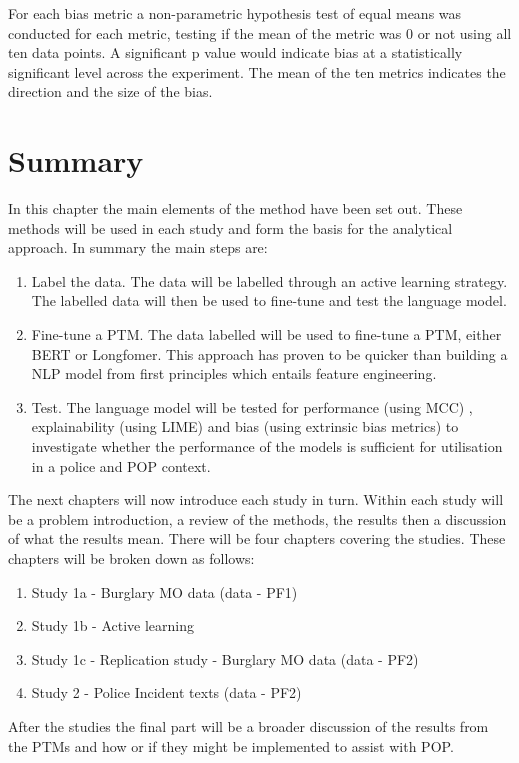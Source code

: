 \begin{itemize}
For each bias metric a non-parametric hypothesis test of equal means was conducted for each metric, testing if the mean of the metric was 0 or not using all ten data points. A significant p value would indicate bias at a statistically significant level across the experiment. The mean of the ten metrics indicates the direction and the size of the bias. 


\end{itemize}


\section{Summary} In this chapter the main elements of the method have been set out. These methods will be used in each study and form the basis for the analytical approach. In summary the main steps are:

\begin{enumerate}
    \item Label the data. The data will be labelled through an active learning strategy. The labelled data will then be used to fine-tune and test the language model.
    
    \item Fine-tune a PTM. The data labelled will be used to fine-tune a PTM, either BERT or Longfomer. This approach has proven to be quicker than building a NLP model from first principles which entails feature engineering.
    
    \item Test. The language model will be tested for performance (using MCC) , explainability (using LIME)  and bias (using extrinsic bias metrics) to investigate whether the performance of the models is sufficient for utilisation in a police and POP context. 
\end{enumerate}


The next chapters will now introduce each study in turn. Within each study will be a problem introduction, a review of the methods, the results then a discussion of what the results mean. There will be four chapters covering the studies. These chapters will be broken down as follows:

\begin{enumerate}
\item Study 1a - Burglary MO data (data - PF1) 
\item Study 1b - Active learning
\item Study 1c - Replication study - Burglary MO data (data - PF2)
\item Study 2 - Police Incident texts (data - PF2)
\end{enumerate}

After the studies the final part will be a broader discussion of the results from the PTMs and how or if they might be implemented to assist with POP.

